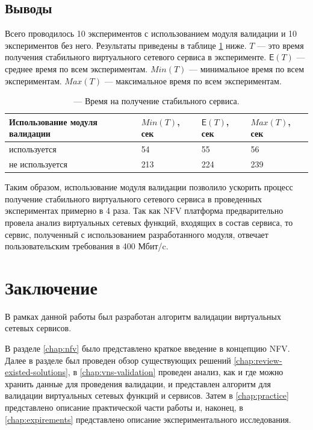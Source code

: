 \documentclass[oneside,final,14pt,a4paper]{extreport}
\newcommand{\Expect}{\mathsf{E}}
\begin{document}
\section{Выводы}
Всего проводилось 10 экспериментов с использованием модуля валидации и 10 экспериментов без него. Результаты приведены в таблице \ref{tab:expirement-time} ниже. $T$ --- это время получения стабильного виртуального сетевого сервиса в эксперименте. $\Expect (T)$ --- среднее время по всем экспериментам. $Min(T)$ --- минимальное время по всем экспериментам. $Max(T)$ --- максимальное время по всем экспериментам.

\renewcommand{\arraystretch}{1.5}
\begin{table}[h]
\center %
\begin{tabular}
{|p{}|p{}|p{}|p{}|} %
\hline %
Использование модуля валидации & $Min(T)$, сек & $\Expect (T)$, сек & $Max(T)$, сек \\
\hline
используется & 54 & 55 & 56 \\
\hline
не используется & 213 & 224 & 239 \\
\hline
\end{tabular}
\caption{--- Время на получение стабильного сервиса.}
\label{tab:expirement-time}
\end{table}

Таким образом, использование модуля валидации позволило ускорить процесс получение стабильного виртуального сетевого сервиса в проведенных экспериментах примерно в 4 раза. Так как NFV платформа предварительно провела анализ виртуальных сетевых функций, входящих в состав сервиса, то сервис, полученный с использованием разработанного модуля, отвечает пользовательским требования в 400 Мбит/c.





\chapter*{Заключение}
В рамках данной работы был разработан алгоритм валидации виртуальных сетевых сервисов.

В разделе \ref{chap:nfv} было представлено краткое введение в концепцию NFV. Далее в разделе был проведен обзор существующих решений \ref{chap:review-existed-solutions}, в \ref{chap:vns-validation} проведен анализ, как и где можно хранить данные для проведения валидации, и представлен алгоритм для валидации виртуальных сетевых функций и сервисов. Затем в \ref{chap:practice} представлено описание практической части работы и, наконец, в \ref{chap:expirements} представлено описание экспериментального исследования.
\end{document}
